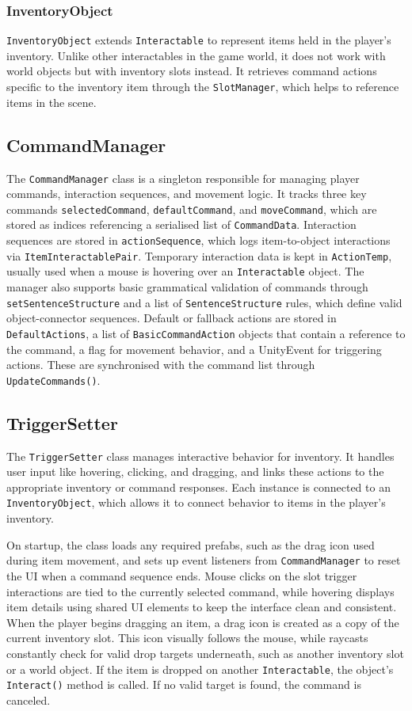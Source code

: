 \subsubsection{InventoryObject}
\verb|InventoryObject| extends \verb|Interactable| to represent items held in the player’s inventory. Unlike other interactables in the game world, it does not work with world objects but with inventory slots instead. It retrieves command actions specific to the inventory item through the \verb|SlotManager|, which helps to reference items in the scene. 

\subsection{CommandManager}
The \verb|CommandManager| class is a singleton responsible for managing player commands, interaction sequences, and movement logic. It tracks three key commands \verb|selectedCommand|, \verb|defaultCommand|, and \verb|moveCommand|, which are stored as indices referencing a serialised list of \verb|CommandData|. Interaction sequences are stored in \verb|actionSequence|, which logs item-to-object interactions via \verb|ItemInteractablePair|. Temporary interaction data is kept in \verb|ActionTemp|, usually used when a mouse is hovering over an \verb|Interactable| object. The manager also supports basic grammatical validation of commands through \verb|setSentenceStructure| and a list of \verb|SentenceStructure| rules, which define valid object-connector sequences. Default or fallback actions are stored in \verb|DefaultActions|, a list of \verb|BasicCommandAction| objects that contain a reference to the command, a flag for movement behavior, and a UnityEvent for triggering actions. These are synchronised with the command list through \verb|UpdateCommands()|.
 

\subsection{TriggerSetter}
The \verb|TriggerSetter| class manages interactive behavior for inventory. It handles user input like hovering, clicking, and dragging, and links these actions to the appropriate inventory or command responses. Each instance is connected to an \verb|InventoryObject|, which allows it to connect behavior to items in the player's inventory.

On startup, the class loads any required prefabs, such as the drag icon used during item movement, and sets up event listeners from \verb|CommandManager| to reset the UI when a command sequence ends. Mouse clicks on the slot trigger interactions are tied to the currently selected command, while hovering displays item details using shared UI elements to keep the interface clean and consistent. When the player begins dragging an item, a drag icon is created as a copy of the current inventory slot. This icon visually follows the mouse, while raycasts constantly check for valid drop targets underneath, such as another inventory slot or a world object. If the item is dropped on another \verb|Interactable|, the object’s \verb|Interact()| method is called. If no valid target is found, the command is canceled.

